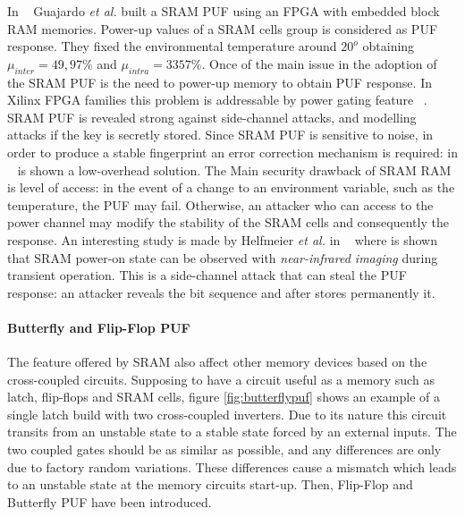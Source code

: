 \documentclass[../tesi.tex]{subfiles}
\begin{document}
In ~\cite{guajardo2007fpga} Guajardo \emph{et al.} built a SRAM PUF using an FPGA with embedded block RAM memories. Power-up values of a SRAM cells group is considered as PUF response. They fixed the environmental temperature around $20^{o}$ obtaining $\mu_{inter} = 49,97\%$ and $\mu_{intra} = 3357\%$. 
Once of the main issue in the adoption of the SRAM PUF is the need to power-up memory to obtain PUF response. In Xilinx FPGA families this problem is addressable by power gating feature ~\cite{wild2014enabling}. SRAM PUF is revealed strong against side-channel attacks, and modelling attacks if the key is secretly stored. 
Since SRAM PUF is sensitive to noise, in order to produce a stable fingerprint an error correction mechanism is required: in ~\cite{maes2009low} is shown a low-overhead solution.
The Main security drawback of SRAM RAM is level of access: in the event of a change to an environment variable, such as the temperature, the PUF may fail. Otherwise, an attacker who can access to the power channel may modify the stability of the SRAM cells and consequently the \puf{} response. An interesting study is made by Helfmeier \textit{et al.} in  ~\cite{helfmeier2013cloning} where is shown that SRAM power-on state can be observed with \emph{near-infrared imaging} during transient operation. This is a side-channel attack that can steal the PUF response: an attacker reveals the bit sequence and after stores permanently it. 
\paragraph{Butterfly and Flip-Flop PUF} \label{par:butterflypuf}
The feature offered by SRAM \puf{} also affect other memory devices based on the cross-coupled circuits. Supposing to have a circuit useful as a memory such as latch, flip-flops and SRAM cells, figure \ref{fig:butterflypuf} shows an example of a single latch build with two cross-coupled inverters. Due to its nature this circuit transits from an unstable state to a stable state forced by an external inputs. The two coupled gates should be as similar as possible, and any differences are only due to factory random variations. These differences cause a mismatch which leads to an unstable state at the  memory circuits start-up. Then, Flip-Flop and Butterfly PUF have been introduced. 
\end{document}
